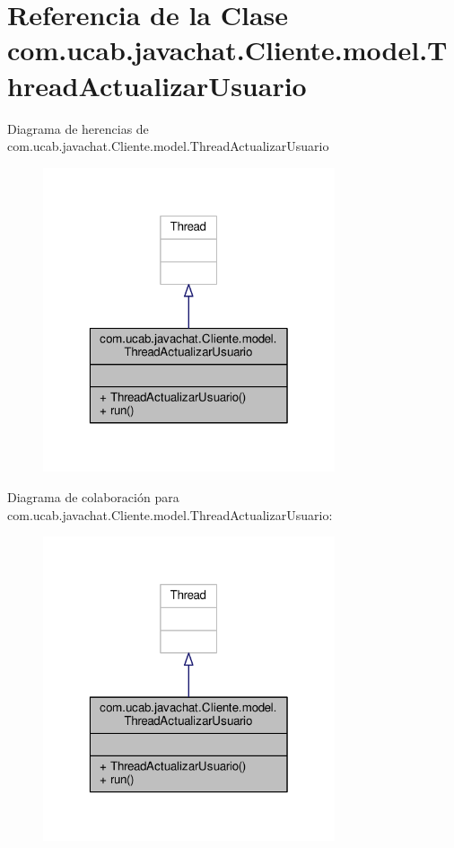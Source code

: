 \hypertarget{classcom_1_1ucab_1_1javachat_1_1_cliente_1_1model_1_1_thread_actualizar_usuario}{\section{Referencia de la Clase com.\-ucab.\-javachat.\-Cliente.\-model.\-Thread\-Actualizar\-Usuario}
\label{classcom_1_1ucab_1_1javachat_1_1_cliente_1_1model_1_1_thread_actualizar_usuario}
}


Diagrama de herencias de com.\-ucab.\-javachat.\-Cliente.\-model.\-Thread\-Actualizar\-Usuario\nopagebreak
\begin{figure}[H]
\begin{center}
\leavevmode
\includegraphics[width=244pt]{classcom_1_1ucab_1_1javachat_1_1_cliente_1_1model_1_1_thread_actualizar_usuario__inherit__graph}
\end{center}
\end{figure}


Diagrama de colaboración para com.\-ucab.\-javachat.\-Cliente.\-model.\-Thread\-Actualizar\-Usuario\-:\nopagebreak
\begin{figure}[H]
\begin{center}
\leavevmode
\includegraphics[width=244pt]{classcom_1_1ucab_1_1javachat_1_1_cliente_1_1model_1_1_thread_actualizar_usuario__coll__graph}
\end{center}
\end{figure}
